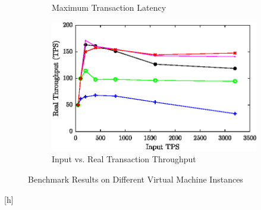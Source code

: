 \documentclass[conference]{IEEEtran}
\begin{document}
\begin{figure}[h]
\begin{subfigure}{0.95\columnwidth}
\caption{Maximum Transaction Latency}%
\label{latency_max}%
\end{subfigure}\hfill%
\begin{subfigure}{0.95\columnwidth}
\includegraphics[width=\columnwidth]{figs/tps.eps}%
\caption{Input vs. Real Transaction Throughput}
\label{fig:TPS}
\end{subfigure}\hfill%
\caption{Benchmark Results on Different Virtual Machine Instances}
\label{latency}%
\end{figure}[h]

\end{document}
